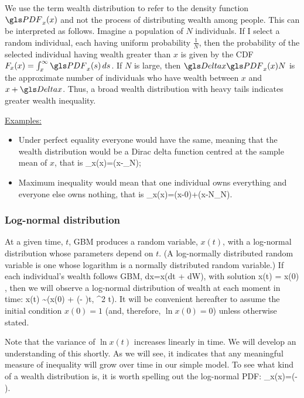 We use the term wealth distribution to refer to the density function $\PDF_x(x)$ and not the process of distributing wealth among people. This can be interpreted as follows. Imagine a population of $N$ individuals. If I select a random individual, each having uniform probability $\frac{1}{N}$, then the probability of the selected individual having wealth greater than $x$ is given by the CDF $F_x(x)=\int_x^\infty \PDF_x(s)\,ds$. If $N$ is large, then $\D x \PDF_x(x)N$ is the approximate number of individuals who have wealth between $x$ and $x+\D x$. Thus, a broad wealth distribution with heavy tails indicates greater wealth inequality.

\underline{Examples:}
\begin{itemize}
\item Under perfect equality everyone would have the same, meaning that the wealth
distribution would be a Dirac delta function centred at the sample mean of $x$, that is
\be
\PDF_x(x)=\delta(x-_N);
\ee
\item
Maximum inequality would mean that one individual owns everything
and everyone else owns nothing, that is
\be 
\PDF_x(x)=\delta(x-0)+\delta(x-N_N).
\ee
\end{itemize}


\subsubsection{Log-normal distribution}
At a given time, $t$, GBM produces a random variable, $x(t)$, with a log-normal distribution whose parameters depend on $t$. (A log-normally distributed random variable is one whose logarithm is a normally distributed random variable.) If each individual's wealth follows GBM,
\be
dx=x(\mu dt + \sigma dW),
\ee
with solution 
\be
x(t) = x(0) \exp{},
\ee
then we will observe a log-normal distribution of wealth at each moment in time:
\be
\ln x(t) \sim {}\left(\ln x(0) + \left(\mu - \right)t, \sigma^2 t\right).
\ee
It will be convenient hereafter to assume the initial condition $x(0)=1$ (and, therefore, $\ln x(0)=0$) unless otherwise stated.

Note that the variance of $\ln x(t)$ increases linearly in time. We will develop an understanding of this shortly. As we will see, it indicates that any meaningful measure of inequality will grow over time in our simple model. To see what kind of a wealth distribution  is, it is worth spelling out the log-normal PDF:
\be
\PDF_x(x)=\exp\left(- \right).
\ee

